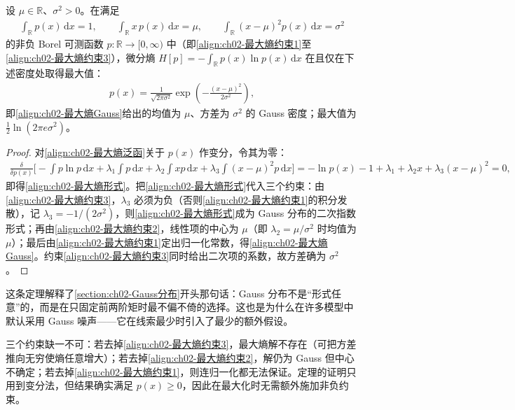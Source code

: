 \documentclass[../../main.tex]{subfiles}
\begin{document}
\begin{theorem}\label{theorem:ch02-最大熵Gauss}
设 $\mu\in\mathbb{R}$、$\sigma^{2}>0$。在满足
\begin{align*}
  \int_{\mathbb{R}}p(x)\,\mathrm{d}x=1,\qquad
  \int_{\mathbb{R}}x\,p(x)\,\mathrm{d}x=\mu,\qquad
  \int_{\mathbb{R}}(x-\mu)^{2}p(x)\,\mathrm{d}x=\sigma^{2}
\end{align*}
的非负 Borel 可测函数 $p:\mathbb{R}\to[0,\infty)$ 中（即\eqref{align:ch02-最大熵约束1}至\eqref{align:ch02-最大熵约束3}），微分熵 $H[p]=-\int_{\mathbb{R}}p(x)\ln p(x)\,\mathrm{d}x$ 在且仅在下述密度处取得最大值：
\begin{align*}
  p(x)=\frac{1}{\sqrt{2\pi\sigma^{2}}}\exp\left(-\frac{(x-\mu)^{2}}{2\sigma^{2}}\right),
\end{align*}
即\eqref{align:ch02-最大熵Gauss}给出的均值为 $\mu$、方差为 $\sigma^{2}$ 的 Gauss 密度；最大值为 $\frac{1}{2}\ln(2\pi e\sigma^{2})$。
\end{theorem}

\begin{proof}
对\eqref{align:ch02-最大熵泛函}关于 $p(x)$ 作变分，令其为零：
\begin{align*}
  \frac{\delta}{\delta p(x)}\Big[-\int p\ln p\,\mathrm{d}x + \lambda_1\!\int p\,\mathrm{d}x + \lambda_2\!\int xp\,\mathrm{d}x + \lambda_3\!\int(x-\mu)^{2}p\,\mathrm{d}x\Big]
  = -\ln p(x) - 1 + \lambda_1 + \lambda_2x + \lambda_3(x-\mu)^{2} = 0 ,
\end{align*}
即得\eqref{align:ch02-最大熵形式}。把\eqref{align:ch02-最大熵形式}代入三个约束：由\eqref{align:ch02-最大熵约束3}，$\lambda_3$ 必须为负（否则\eqref{align:ch02-最大熵约束1}的积分发散），记 $\lambda_3=-1/(2\sigma^{2})$，则\eqref{align:ch02-最大熵形式}成为 Gauss 分布的二次指数形式；再由\eqref{align:ch02-最大熵约束2}，线性项的中心为 $\mu$（即 $\lambda_2=\mu/\sigma^{2}$ 时均值为 $\mu$）；最后由\eqref{align:ch02-最大熵约束1}定出归一化常数，得\eqref{align:ch02-最大熵Gauss}。约束\eqref{align:ch02-最大熵约束3}同时给出二次项的系数，故方差确为 $\sigma^{2}$。
\end{proof}

\begin{remark}
这条定理解释了\cref{section:ch02-Gauss分布}开头那句话：Gauss 分布不是“形式任意”的，而是在只固定前两阶矩时最不偏不倚的选择。这也是为什么在许多模型中默认采用 Gauss 噪声——它在线索最少时引入了最少的额外假设。

三个约束缺一不可：若去掉\eqref{align:ch02-最大熵约束3}，最大熵解不存在（可把方差推向无穷使熵任意增大）；若去掉\eqref{align:ch02-最大熵约束2}，解仍为 Gauss 但中心不确定；若去掉\eqref{align:ch02-最大熵约束1}，则连归一化都无法保证。定理的证明只用到变分法，但结果确实满足 $p(x)\geqslant0$，因此在最大化时无需额外施加非负约束。
\end{remark}
\end{document}
